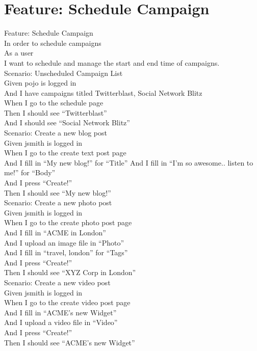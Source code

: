 \documentclass[12pt]{article}
\begin{document}
\section{Feature: Schedule Campaign}

Feature: Schedule Campaign \\
  In order to schedule campaigns \\
  As a user \\
  I want to schedule and manage the start and end time of campaigns. \\

Scenario: Unscheduled Campaign List \\
  Given pojo is logged in \\
  And I have campaigns titled Twitterblast, Social Network Blitz \\
  When I go to the schedule page \\
  Then I should see ``Twitterblast'' \\
  And I should see ``Social Network Blitz'' \\
  
Scenario: Create a new blog post \\
  Given jsmith is logged in \\
  When I go to the create text post page \\
  And I fill in ``My new blog!'' for ``Title''
  And I fill in ``I'm so awesome.. listen to me!'' for ``Body'' \\
  And I press ``Create!'' \\
  Then I should see ``My new blog!'' \\
  
Scenario: Create a new photo post \\
  Given jsmith is logged in \\
  When I go to the create photo post page \\
  And I fill in ``ACME in London'' \\
  And I upload an image file in ``Photo'' \\
  And I fill in ``travel, london'' for ``Tags'' \\
  And I press ``Create!'' \\
  Then I should see ``XYZ Corp in London'' \\
  
  Scenario: Create a new video post \\
    Given jsmith is logged in \\
    When I go to the create video post page \\
    And I fill in ``ACME's new Widget'' \\
    And I upload a video file in ``Video'' \\
    And I press ``Create!'' \\
    Then I should see ``ACME's new Widget'' \\
  
\end{document}
